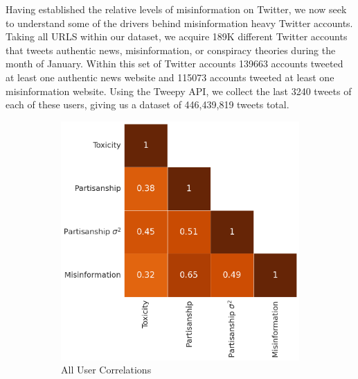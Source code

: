 Having established the relative levels of misinformation on Twitter, we now seek to understand some of the drivers behind misinformation heavy Twitter accounts. Taking all URLS within our dataset, we acquire 189K different Twitter accounts that tweets authentic news, misinformation, or conspiracy theories during the month of January. Within this set of Twitter accounts 139663 accounts tweeted at least one authentic news website and 115073 accounts tweeted at least one misinformation website. Using the Tweepy API, we collect the last 3240 tweets of each of these users, giving us a dataset of 446,439,819 tweets total. 

\begin{figure}
\begin{subfigure}{.25\textwidth}
  \centering
  \includegraphics[width=1\linewidth]{figures/all-correlations.png}
  \caption{All User Correlations}
\label{fig:twitter-reddit-partisanship-time}
\end{subfigure}%
\hspace{20pt}
\begin{subfigure}{.25\textwidth}
  \centering

\end{subfigure}
\end{figure}
